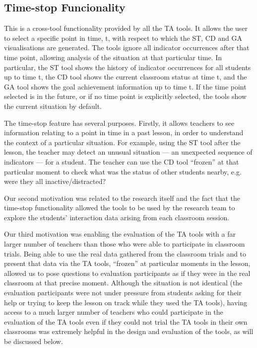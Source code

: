 \subsection{Time-stop Funcionality}
\label{sec:time-stop-func}

This is a cross-tool functionality provided by all the TA tools. It
allows the user to select a specific point in time, t, with respect to
which the ST, CD and GA visualisations are generated. The tools ignore
all indicator occurrences after that time point, allowing analysis of
the situation at that particular time. In particular, the ST tool
shows the history of indicator occurrences for all students up to time
t, the CD tool shows the current classroom status at time t, and the
GA tool shows the goal achievement information up to time t.  If the
time point selected is in the future, or if no time point is
explicitly selected, the tools show the current situation by default.
 
The time-stop feature has several purposes. Firstly, it allows
teachers to see information relating to a point in time in a past
lesson, in order to understand the context of a particular
situation. For example, using the ST tool after the lesson, the
teacher may detect an unusual situation --- an unexpected sequence of
indicators --- for a student. The teacher can use the CD tool “frozen”
at that particular moment to check what was the status of other
students nearby, e.g. were they all inactive/distracted?
 
Our second motivation was related to the research itself and the fact
that the time-stop functionality allowed the tools to be used by
the research team to explore the students' interaction data arising
from each classroom session.

Our third motivation was enabling the evaluation of the TA tools with
a far larger number of teachers than those who were able to
participate in classroom trials. Being able to use the real data
gathered from the classroom trials and to present that data via the TA
tools, “frozen” at particular moments in the lesson, allowed us to
pose questions to evaluation participants as if they were in the real
classroom at that precise moment. Although the situation is not
identical (the evaluation participants were not under pressure from
students asking for their help or trying to keep the lesson on track
while they used the TA tools), having access to a much larger number
of teachers who could participate in the evaluation of the TA tools
even if they could not trial the TA tools in their own classrooms was
extremely helpful in the design and evaluation of the tools, as
will be discussed below.

